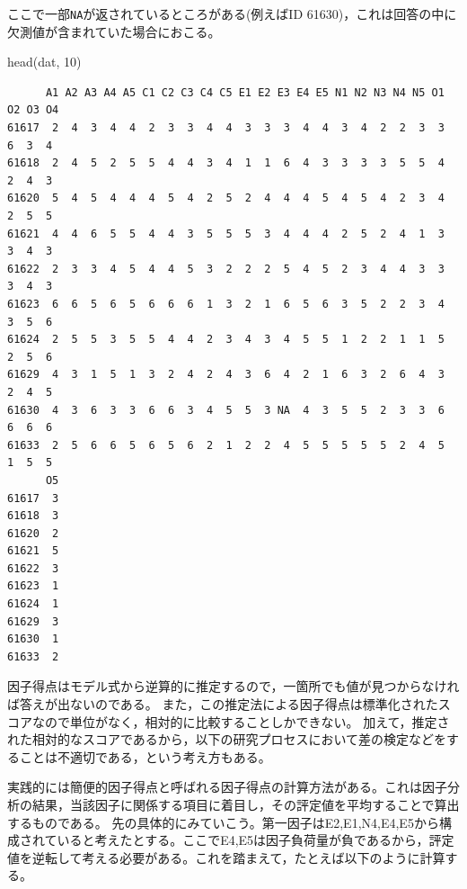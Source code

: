 \documentclass[
  a4paper,
]{ltjsbook}
\newenvironment{Shaded}{\begin{snugshade}}{\end{snugshade}}
\newcommand{\DecValTok}[1]{\textcolor[rgb]{0.68,0.00,0.00}{#1}}
\newcommand{\FunctionTok}[1]{\textcolor[rgb]{0.28,0.35,0.67}{#1}}
\newcommand{\NormalTok}[1]{\textcolor[rgb]{0.00,0.23,0.31}{#1}}
\begin{document}
ここで一部\texttt{NA}が返されているところがある(例えばID
61630)，これは回答の中に欠測値が含まれていた場合におこる。

\begin{Shaded}
\begin{Highlighting}[]
\FunctionTok{head}\NormalTok{(dat, }\DecValTok{10}\NormalTok{)}
\end{Highlighting}
\end{Shaded}

\begin{verbatim}
      A1 A2 A3 A4 A5 C1 C2 C3 C4 C5 E1 E2 E3 E4 E5 N1 N2 N3 N4 N5 O1 O2 O3 O4
61617  2  4  3  4  4  2  3  3  4  4  3  3  3  4  4  3  4  2  2  3  3  6  3  4
61618  2  4  5  2  5  5  4  4  3  4  1  1  6  4  3  3  3  3  5  5  4  2  4  3
61620  5  4  5  4  4  4  5  4  2  5  2  4  4  4  5  4  5  4  2  3  4  2  5  5
61621  4  4  6  5  5  4  4  3  5  5  5  3  4  4  4  2  5  2  4  1  3  3  4  3
61622  2  3  3  4  5  4  4  5  3  2  2  2  5  4  5  2  3  4  4  3  3  3  4  3
61623  6  6  5  6  5  6  6  6  1  3  2  1  6  5  6  3  5  2  2  3  4  3  5  6
61624  2  5  5  3  5  5  4  4  2  3  4  3  4  5  5  1  2  2  1  1  5  2  5  6
61629  4  3  1  5  1  3  2  4  2  4  3  6  4  2  1  6  3  2  6  4  3  2  4  5
61630  4  3  6  3  3  6  6  3  4  5  5  3 NA  4  3  5  5  2  3  3  6  6  6  6
61633  2  5  6  6  5  6  5  6  2  1  2  2  4  5  5  5  5  5  2  4  5  1  5  5
      O5
61617  3
61618  3
61620  2
61621  5
61622  3
61623  1
61624  1
61629  3
61630  1
61633  2
\end{verbatim}

因子得点はモデル式から逆算的に推定するので，一箇所でも値が見つからなければ答えが出ないのである。
また，この推定法による因子得点は標準化されたスコアなので単位がなく，相対的に比較することしかできない。
加えて，推定された相対的なスコアであるから，以下の研究プロセスにおいて差の検定などをすることは不適切である，という考え方もある。

実践的には簡便的因子得点と呼ばれる因子得点の計算方法がある。これは因子分析の結果，当該因子に関係する項目に着目し，その評定値を平均することで算出するものである。
先の具体的にみていこう。第一因子はE2,E1,N4,E4,E5から構成されていると考えたとする。ここでE4,E5は因子負荷量が負であるから，評定値を逆転して考える必要がある。これを踏まえて，たとえば以下のように計算する。
\end{document}
